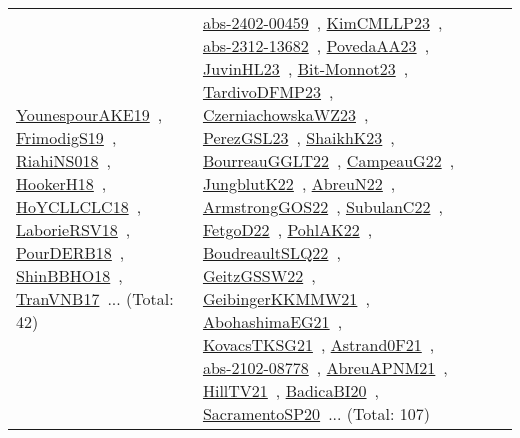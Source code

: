 {\begin{longtable}{lp{3cm}>{\raggedright\arraybackslash}p{6cm}>{\raggedright\arraybackslash}p{6cm}>{\raggedright\arraybackslash}p{8cm}}
\href{works/YounespourAKE19.pdf}{YounespourAKE19}~\cite{YounespourAKE19}, \href{works/FrimodigS19.pdf}{FrimodigS19}~\cite{FrimodigS19}, \href{works/RiahiNS018.pdf}{RiahiNS018}~\cite{RiahiNS018}, \href{works/HookerH18.pdf}{HookerH18}~\cite{HookerH18}, \href{works/HoYCLLCLC18.pdf}{HoYCLLCLC18}~\cite{HoYCLLCLC18}, \href{works/LaborieRSV18.pdf}{LaborieRSV18}~\cite{LaborieRSV18}, \href{works/PourDERB18.pdf}{PourDERB18}~\cite{PourDERB18}, \href{works/ShinBBHO18.pdf}{ShinBBHO18}~\cite{ShinBBHO18}, \href{works/TranVNB17.pdf}{TranVNB17}~\cite{TranVNB17}... (Total: 42) & \href{works/abs-2402-00459.pdf}{abs-2402-00459}~\cite{abs-2402-00459}, \href{works/KimCMLLP23.pdf}{KimCMLLP23}~\cite{KimCMLLP23}, \href{works/abs-2312-13682.pdf}{abs-2312-13682}~\cite{abs-2312-13682}, \href{works/PovedaAA23.pdf}{PovedaAA23}~\cite{PovedaAA23}, \href{works/JuvinHL23.pdf}{JuvinHL23}~\cite{JuvinHL23}, \href{works/Bit-Monnot23.pdf}{Bit-Monnot23}~\cite{Bit-Monnot23}, \href{works/TardivoDFMP23.pdf}{TardivoDFMP23}~\cite{TardivoDFMP23}, \href{works/CzerniachowskaWZ23.pdf}{CzerniachowskaWZ23}~\cite{CzerniachowskaWZ23}, \href{works/PerezGSL23.pdf}{PerezGSL23}~\cite{PerezGSL23}, \href{works/ShaikhK23.pdf}{ShaikhK23}~\cite{ShaikhK23}, \href{works/BourreauGGLT22.pdf}{BourreauGGLT22}~\cite{BourreauGGLT22}, \href{works/CampeauG22.pdf}{CampeauG22}~\cite{CampeauG22}, \href{works/JungblutK22.pdf}{JungblutK22}~\cite{JungblutK22}, \href{works/AbreuN22.pdf}{AbreuN22}~\cite{AbreuN22}, \href{works/ArmstrongGOS22.pdf}{ArmstrongGOS22}~\cite{ArmstrongGOS22}, \href{works/SubulanC22.pdf}{SubulanC22}~\cite{SubulanC22}, \href{works/FetgoD22.pdf}{FetgoD22}~\cite{FetgoD22}, \href{works/PohlAK22.pdf}{PohlAK22}~\cite{PohlAK22}, \href{works/BoudreaultSLQ22.pdf}{BoudreaultSLQ22}~\cite{BoudreaultSLQ22}, \href{works/GeitzGSSW22.pdf}{GeitzGSSW22}~\cite{GeitzGSSW22}, \href{works/GeibingerKKMMW21.pdf}{GeibingerKKMMW21}~\cite{GeibingerKKMMW21}, \href{works/AbohashimaEG21.pdf}{AbohashimaEG21}~\cite{AbohashimaEG21}, \href{works/KovacsTKSG21.pdf}{KovacsTKSG21}~\cite{KovacsTKSG21}, \href{works/Astrand0F21.pdf}{Astrand0F21}~\cite{Astrand0F21}, \href{works/abs-2102-08778.pdf}{abs-2102-08778}~\cite{abs-2102-08778}, \href{works/AbreuAPNM21.pdf}{AbreuAPNM21}~\cite{AbreuAPNM21}, \href{works/HillTV21.pdf}{HillTV21}~\cite{HillTV21}, \href{works/BadicaBI20.pdf}{BadicaBI20}~\cite{BadicaBI20}, \href{works/SacramentoSP20.pdf}{SacramentoSP20}~\cite{SacramentoSP20}... (Total: 107)\\

\end{longtable}}
